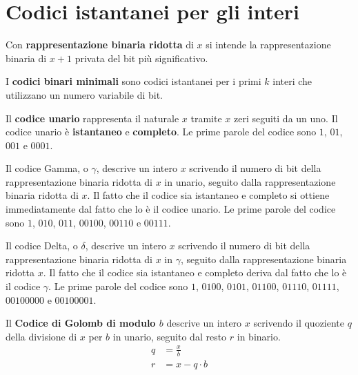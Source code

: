\documentclass[\main/main.tex]{subfiles}
\begin{document}
\section{Codici istantanei per gli interi}
\begin{multicols}{2}
\begin{definition}
    Con \textbf{rappresentazione binaria ridotta} di \(x\) si intende la rappresentazione binaria di \(x+1\) privata del bit più significativo.
\end{definition}
\begin{definition}
    I \textbf{codici binari minimali} sono codici istantanei per i primi \(k\) interi che utilizzano un numero variabile di bit.
\end{definition}
\begin{definition}
    Il \textbf{codice unario} rappresenta il naturale \(x\) tramite \(x\) zeri seguiti da un uno. Il codice unario è \textbf{istantaneo} e \textbf{completo}. Le prime parole del codice sono \(1\), \(01\), \(001\) e \(0001\).
\end{definition}
\begin{definition}
    Il codice Gamma, o \(\gamma\), descrive un intero \(x\) scrivendo il numero di bit della rappresentazione binaria ridotta di \(x\) in unario, seguito dalla rappresentazione binaria ridotta di \(x\). Il fatto che il codice sia istantaneo e completo si ottiene immediatamente dal fatto che lo è il codice unario. Le prime parole del codice sono \(1\), \(010\), \(011\), \(00100\), \(00110\) e \(00111\).
\end{definition}
\begin{definition}
    Il codice Delta, o \(\delta\), descrive un intero \(x\) scrivendo il numero di bit della rappresentazione binaria ridotta di \(x\) in \(\gamma\), seguito dalla rappresentazione binaria ridotta \(x\). Il fatto che il codice sia istantaneo e completo deriva dal fatto che lo è il codice \(\gamma\). Le prime parole del codice sono \(1\), \(0100\), \(0101\), \(01100\), \(01110\), \(01111\), \(00100000\) e \(00100001\).
\end{definition}
\begin{definition}
    Il \textbf{Codice di Golomb di modulo \(b\)} descrive un intero \(x\) scrivendo il quoziente \(q\) della divisione di \(x\) per \(b\) in unario, seguito dal resto \(r\) in binario.
    \[
    \begin{aligned} q &=\frac{x}{b} \\ r &=x-q \cdot b \end{aligned}
\]
\end{definition}
\end{multicols}
\end{document}
